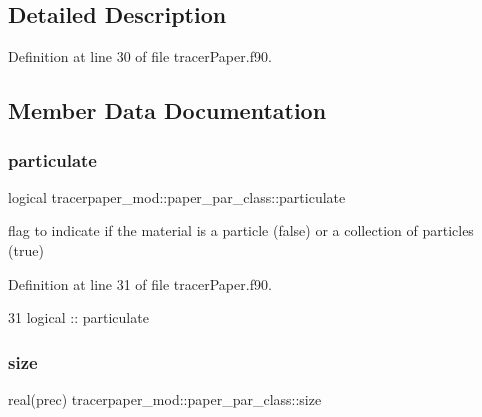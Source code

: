 \subsection{Detailed Description}


Definition at line 30 of file tracer\+Paper.\+f90.



\subsection{Member Data Documentation}
\mbox{\label{structtracerpaper__mod_1_1paper__par__class_a3b237f726cdf3f35fa122047d0175351}} 
\subsubsection{\texorpdfstring{particulate}{particulate}}
{\footnotesize\ttfamily logical tracerpaper\+\_\+mod\+::paper\+\_\+par\+\_\+class\+::particulate\hspace{0.3cm}{\ttfamily [private]}}



flag to indicate if the material is a particle (false) or a collection of particles (true) 



Definition at line 31 of file tracer\+Paper.\+f90.


\begin{DoxyCode}
31         \textcolor{keywordtype}{logical}    :: particulate
\end{DoxyCode}
\mbox{\label{structtracerpaper__mod_1_1paper__par__class_a25325a2f6e0e3a16e1a2abffe5d0f6c8}} 
\subsubsection{\texorpdfstring{size}{size}}
{\footnotesize\ttfamily real(prec) tracerpaper\+\_\+mod\+::paper\+\_\+par\+\_\+class\+::size\hspace{0.3cm}{\ttfamily [private]}}



